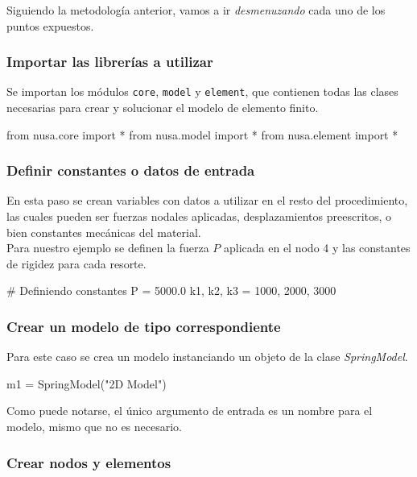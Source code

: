 Siguiendo la metodología anterior, vamos a ir \textit{desmenuzando} cada uno de los 
puntos expuestos.\\


\subsubsection*{Importar las librerías a utilizar}

Se importan los módulos \texttt{core}, \texttt{model} y \texttt{element}, que contienen 
todas las clases necesarias para crear y solucionar el modelo de elemento finito.

\begin{python}
from nusa.core import *
from nusa.model import *
from nusa.element import *
\end{python}


\subsubsection*{Definir constantes o datos de entrada}

En esta paso se crean variables con datos a utilizar en el resto del procedimiento, las 
cuales pueden ser fuerzas nodales aplicadas, desplazamientos preescritos, o bien constantes 
mecánicas del material.\\

Para nuestro ejemplo se definen la fuerza $P$ aplicada en el nodo 4 y las constantes de rigidez 
para cada resorte.

\begin{python}
# Definiendo constantes
P = 5000.0
k1, k2, k3 = 1000, 2000, 3000
\end{python}

\subsubsection*{Crear un modelo de tipo correspondiente}

Para este caso se crea un modelo instanciando un objeto de la clase \textit{SpringModel}.

\begin{python}
    m1 = SpringModel("2D Model")
\end{python}

Como puede notarse, el único argumento de entrada es un nombre para el modelo, mismo que no es necesario.


\subsubsection*{Crear nodos y elementos}



